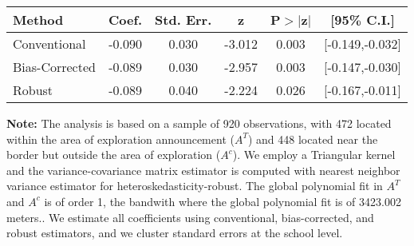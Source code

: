 \begin{table}[htbp]\centering
 \footnotesize 
\begin{tabular}{lccccc}
\hline\hline
Method & Coef. & Std. Err. & z & P$>|$z$|$ & [95\% C.I.] \\ 
\hline \hline  
Conventional & -0.090 & 0.030 & -3.012 & 0.003 & [-0.149,-0.032] \\ 
 Bias-Corrected & -0.089 & 0.030 & -2.957 & 0.003 & [-0.147,-0.030] \\ 
Robust & -0.089 & 0.040 & -2.224 & 0.026 & [-0.167,-0.011] \\ 
  \hline\hline
\end{tabular}
\label{table:rd}
\begin{tablenotes} 
  \justifying \tiny \textbf{Note: }    
   The analysis is based on a sample of 920 observations, with 472 located within the area of exploration announcement ($A^{T}$) and 448 located near the border but outside the area of exploration  ($A^{c}$). 
           We employ a Triangular kernel and the variance-covariance matrix estimator is computed with nearest neighbor variance estimator for heteroskedasticity-robust. The global polynomial fit in  $A^{T}$ and $A^{c}$ is of order 1, the bandwith where the global polynomial fit is of 3423.002 meters.. We estimate all coefficients using conventional, bias-corrected, and robust estimators, and we cluster standard errors at the school level. \end{tablenotes} 
 \end{table} 
